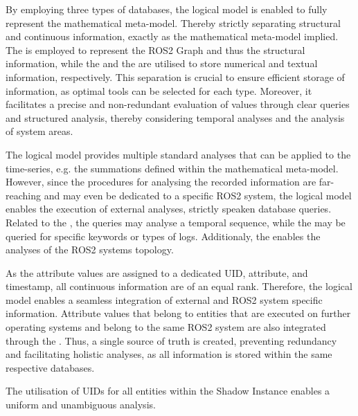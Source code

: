         By employing three types of databases, the logical model is enabled to fully represent the mathematical meta-model. Thereby strictly separating structural and continuous information, exactly as the mathematical meta-model implied. The  is employed to represent the ROS2 Graph and thus the structural information, while the  and the  are utilised to store numerical and textual information, respectively. This separation is crucial to ensure efficient storage of information, as optimal tools can be selected for each type. Moreover, it facilitates a precise and non-redundant evaluation of values through clear queries and structured analysis, thereby considering temporal analyses and the analysis of system areas.

        The logical model provides multiple standard analyses that can be applied to the time-series, e.g. the summations defined within the mathematical meta-model. However, since the procedures for analysing the recorded information are far-reaching and may even be dedicated to a specific ROS2 system, the logical model enables the execution of external analyses, strictly speaken database queries. Related to the , the queries may analyse a temporal sequence, while the  may be queried for specific keywords or types of logs. Additionaly, the  enables the analyses of the ROS2 systems topology.

        As the attribute values are assigned to a dedicated UID, attribute, and timestamp, all continuous information are of an equal rank. Therefore, the logical model enables a seamless integration of external and ROS2 system specific information.\newline
        Attribute values that belong to entities that are executed on further operating systems and belong to the same ROS2 system are also integrated through the . Thus, a single source of truth is created, preventing redundancy and facilitating holistic analyses, as all information is stored within the same respective databases.

        The utilisation of UIDs for all entities within the Shadow Instance enables a uniform and unambiguous analysis.


